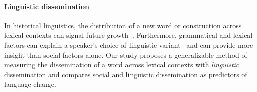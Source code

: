 \paragraph{Linguistic dissemination}
In historical linguistics, the distribution of a new word or construction across lexical contexts can signal future growth~\cite{partington1993}.
Furthermore, grammatical and lexical factors can explain a speaker's choice of linguistic variant~\cite{ito2003,cacoullos2009} and can provide more insight than social factors alone.
Our study proposes a generalizable method of measuring the dissemination of a word across lexical contexts with \emph{linguistic} dissemination and compares social and linguistic dissemination as predictors of language change.